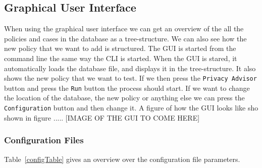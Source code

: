 \subsection{Graphical User Interface}
When using the graphical user interface we can get an overview of the all the policies and cases in the database as a tree-structure. We can also see how the new policy that we want to add is structured. The GUI is started from the command line the same way the CLI is started. When the GUI is stared, it automatically loads the database file, and displays it in the tree-structure. It also shows the new policy that we want to test. If we then press the \texttt{Privacy Advisor} button and press the \texttt{Run} button the process should start. If we want to change the location of the database, the new policy or anything else we can press the \texttt{Configuration} button and then change it. A figure of how the GUI looks like sho shown in figure ..... [IMAGE OF THE GUI TO COME HERE]

\subsubsection{Configuration Files}

Table~\ref{configTable} gives an overview over the configuration file parameters.

